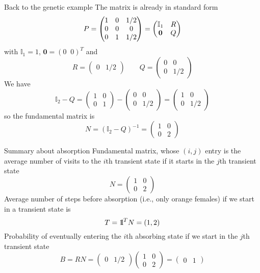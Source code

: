 \documentclass[aspectratio=169]{beamer}\usepackage[]{graphicx}\usepackage[]{xcolor}
\begin{document}
\begin{frame}{Back to the genetic example}
The matrix is already in standard form
\[
P=
\begin{pmatrix}
1 & 0 & 1/2 \\
0 & 0 & 0 \\
0 & 1 & 1/2
\end{pmatrix}
=\begin{pmatrix}
\mathbb{I}_1 & R \\
\b0 & Q
\end{pmatrix}
\]
with $\mathbb{I}_1=1$, $\mathbf{0}=(0\;\; 0)^T$ and
\[
R=\begin{pmatrix}
0 & 1/2
\end{pmatrix}
\qquad
Q=\begin{pmatrix}
0 & 0\\
0 & 1/2
\end{pmatrix}
\]
We have
\[
\mathbb{I}_2-Q=\begin{pmatrix}
1 & 0 \\
0 & 1
\end{pmatrix}
-\begin{pmatrix}
0 & 0\\
0 & 1/2
\end{pmatrix}
=\begin{pmatrix}
1 & 0\\
0 & 1/2
\end{pmatrix}
\]
so the fundamental matrix is
\[
N=(\mathbb{I}_2-Q)^{-1}=
\begin{pmatrix}
1 & 0 \\
0 & 2
\end{pmatrix}
\]
\end{frame}


\begin{frame}{Summary about absorption}
Fundamental matrix, whose $(i,j)$ entry is the average number of visits to the $i$th transient state if it starts in the $j$th transient state
\[
N=
\begin{pmatrix}
1 & 0 \\
0 & 2
\end{pmatrix}
\]
\vfill
Average number of steps before absorption (i.e., only orange females) if we start in a transient state is
\[
T=\nbOne^TN=(1,2)
\]
\vfill
Probability of eventually entering the $i$th absorbing state if we start in the $j$th transient state
\[
B=RN=
\begin{pmatrix}
	0 & 1/2
\end{pmatrix}
\begin{pmatrix}
1 & 0 \\
0 & 2
\end{pmatrix}
=
\begin{pmatrix}
0 & 1
\end{pmatrix}
\]
\end{frame}
\end{document}

